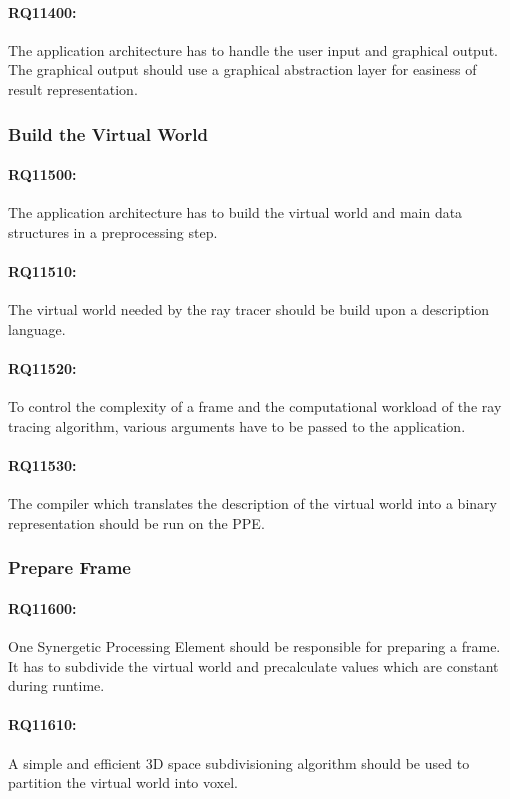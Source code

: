 \documentclass[DIV10, abstracton, openright, footsepline, headsepline, twoside, 9pt,
bigheadings]{scrreprt}
\begin{document}
\paragraph{RQ11400:}The application architecture has to handle the user input
and graphical output. The graphical output should use a graphical abstraction
layer for easiness of result representation.


\subsubsection{Build the Virtual World}
\paragraph{RQ11500:} The application architecture has to build the virtual world
and main data structures in a preprocessing step.
\paragraph{RQ11510:} The virtual world needed by the ray tracer should be build upon
a description language.
\paragraph{RQ11520:} To control the complexity of a frame and the computational
workload of the ray tracing algorithm, various arguments have to be passed to
the application.
\paragraph{RQ11530:} The compiler which translates the description of the
virtual world into a binary representation should be run on the PPE.


\subsubsection{Prepare Frame}
\paragraph{RQ11600:}  One Synergetic Processing Element should be
responsible for preparing a frame. It has to subdivide the virtual world and
precalculate values which are constant during runtime.
\paragraph{RQ11610:} A simple and efficient 3D space subdivisioning algorithm
should be used to partition the virtual world into voxel.
\end{document}
